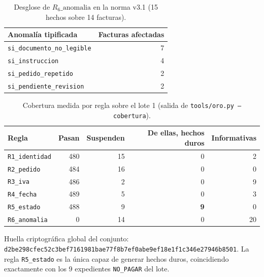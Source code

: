 \documentclass[11pt,a4paper]{article}
\begin{document}
\begin{table}[htbp]
\centering
\begin{tabular}{l r}
\toprule
\textbf{Anomalía tipificada} & \textbf{Facturas afectadas} \\
\midrule
\texttt{si\_documento\_no\_legible} & 7 \\
\texttt{si\_instruccion} & 4 \\
\texttt{si\_pedido\_repetido} & 2 \\
\texttt{si\_pendiente\_revision} & 2 \\
\bottomrule
\end{tabular}
\caption{Desglose de $R_6\text{\_anomalia}$ en la norma v3.1 (15 hechos sobre 14 facturas).}
\end{table}

\begin{table}[htbp]
\centering
\begin{tabular}{lrrrr}
\toprule
\textbf{Regla} & \textbf{Pasan} & \textbf{Suspenden} & \textbf{De ellas, hechos duros} & \textbf{Informativas} \\
\midrule
\texttt{R1\_identidad} & 480 & 15 & 0 & 2 \\
\texttt{R2\_pedido}    & 484 & 16 & 0 & 0 \\
\texttt{R3\_iva}       & 486 &  2 & 0 & 9 \\
\texttt{R4\_fecha}     & 489 &  5 & 0 & 3 \\
\texttt{R5\_estado}    & 488 &  9 & \textbf{9} & 0 \\
\texttt{R6\_anomalia}  &   0 & 14 & 0 & 20 \\
\bottomrule
\end{tabular}
\caption{Cobertura medida por regla sobre el lote 1 (salida de \texttt{tools/oro.py --cobertura}).}
\end{table}

Huella criptográfica global del conjunto: \texttt{d2be298cfec52c3bef7161981bae77f8b7ef0abe9ef18e1f1c346e27946b8501}. La regla \texttt{R5\_estado} es la única capaz de generar hechos duros, coincidiendo exactamente con los 9 expedientes \texttt{NO\_PAGAR} del lote.
\end{document}
